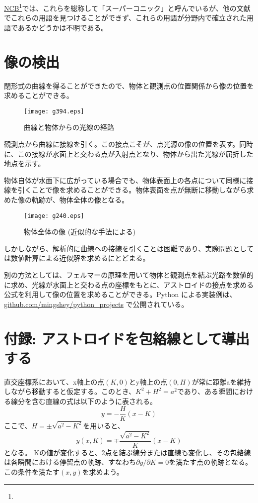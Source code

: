 \documentclass[twocolumn]{article}
\begin{document}
\href{https://old.nationalcurvebank.org/superconicncb/superconicncb.htm}{NCB}\footnote{}では、これらを総称して「スーパーコニック」と呼んでいるが、他の文献でこれらの用語を見つけることができず、これらの用語が分野内で確立された用語であるかどうかは不明である。

\section{像の検出}

閉形式の曲線を得ることができたので、物体と観測点の位置関係から像の位置を求めることができる。

\begin{figure}[h]
	\centering
	\texttt{[image: g394.eps]}
	\caption{曲線と物体からの光線の経路}
	\label{fig:caustic_raypath}
\end{figure}

観測点から曲線に接線を引く。この接点こそが、点光源の像の位置を表す。同時に、この接線が水面上と交わる点が入射点となり、物体から出た光線が屈折した地点を示す。

物体自体が水面下に広がっている場合でも、物体表面上の各点について同様に接線を引くことで像を求めることができる。物体表面を点が無断に移動しながら求めた像の軌跡が、物体全体の像となる。

\begin{figure}[h]
	\centering
	\texttt{[image: g240.eps]}
	\caption{物体全体の像 (近似的な手法による)}
	\label{fig:extended_image}
\end{figure}

しかしながら、解析的に曲線への接線を引くことは困難であり、実際問題としては数値計算による近似解を求めるにとどまる。

別の方法としては、フェルマーの原理を用いて物体と観測点を結ぶ光路を数値的に求め、光線が水面上と交わる点の座標をもとに、アストロイドの接点を求める公式を利用して像の位置を求めることができる。Python による実装例は、\href{https://github.com/mingshey/python_projects/blob/main/Refraction_Image_en.ipynb}{github.com/mingshey/python\_projects} で公開されている。

\appendix
\newcommand{\pardiff}[2]{{\frac{\partial #1}{\partial #2}}}
\newcommand{\ilpardiff}[2]{{{\partial #1}/{\partial #2}}}
\section*{付録: アストロイドを包絡線として導出する}
直交座標系において、x軸上の点$(K, 0)$とy軸上の点$(0, H)$が常に距離aを維持しながら移動すると仮定する。このとき、$K^2+H^2=a^2$であり、ある瞬間における線分を含む直線の式は以下のように表される。
$$y=-\dfrac{H}{K}(x-K)$$
ここで、$H=\pm \sqrt{a^2-K^2}$を用いると、
$$y(x, K) = \mp \dfrac{\sqrt{a^2-K^2}}{K}(x-K)$$
となる。
Kの値が変化すると、2点を結ぶ線分または直線も変化し、その包絡線は各瞬間における停留点の軌跡、すなわち$\ilpardiff{y}{K} = 0$を満たす点の軌跡となる。この条件を満たす$(x, y)$を求めよう。
\end{document}
